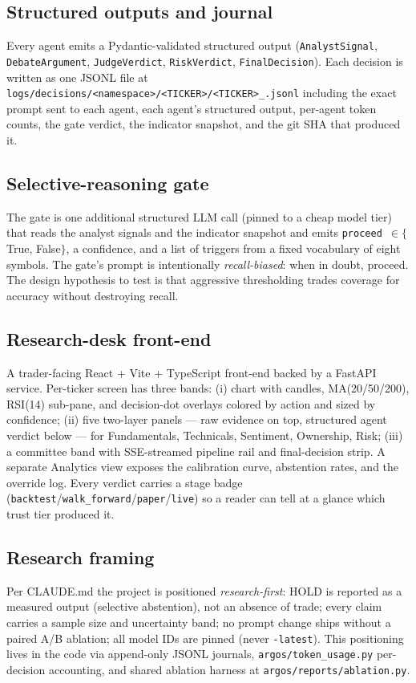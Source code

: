 \documentclass[conference]{IEEEtran}
\begin{document}
\subsection{Structured outputs and journal}
Every agent emits a Pydantic-validated structured output
(\texttt{AnalystSignal}, \texttt{DebateArgument}, \texttt{JudgeVerdict},
\texttt{RiskVerdict}, \texttt{FinalDecision}). Each decision is written
as one JSONL file at
\texttt{logs/decisions/<namespace>/<TICKER>/<TICKER>\_<YYYY-MM-DD>.jsonl}
including the exact prompt sent to each agent, each agent's
structured output, per-agent token counts, the gate verdict, the
indicator snapshot, and the git SHA that produced it.

\subsection{Selective-reasoning gate}
The gate is one additional structured LLM call (pinned to a cheap
model tier) that reads the analyst signals and the indicator snapshot
and emits \texttt{proceed}~$\in\{$True, False$\}$, a confidence, and
a list of triggers from a fixed vocabulary of eight symbols. The
gate's prompt is intentionally \emph{recall-biased}: when in doubt,
proceed. The design hypothesis to test is that aggressive
thresholding trades coverage for accuracy without destroying recall.

\subsection{Research-desk front-end}
A trader-facing React + Vite + TypeScript front-end backed by a
FastAPI service. Per-ticker screen has three bands:
(i) chart with candles, MA(20/50/200), RSI(14) sub-pane, and
decision-dot overlays colored by action and sized by confidence;
(ii) five two-layer panels --- raw evidence on top, structured
agent verdict below --- for Fundamentals, Technicals, Sentiment,
Ownership, Risk; (iii) a committee band with SSE-streamed
pipeline rail and final-decision strip. A separate Analytics view
exposes the calibration curve, abstention rates, and the override
log. Every verdict carries a stage badge
(\texttt{backtest}/\texttt{walk\_forward}/\texttt{paper}/\texttt{live})
so a reader can tell at a glance which trust tier produced it.

\subsection{Research framing}
Per CLAUDE.md the project is positioned \emph{research-first}: HOLD
is reported as a measured output (selective abstention), not an
absence of trade; every claim carries a sample size and uncertainty
band; no prompt change ships without a paired A/B ablation; all
model IDs are pinned (never \texttt{-latest}). This positioning
lives in the code via append-only JSONL journals,
\texttt{argos/token\_usage.py} per-decision accounting, and shared
ablation harness at \texttt{argos/reports/ablation.py}.
\end{document}
